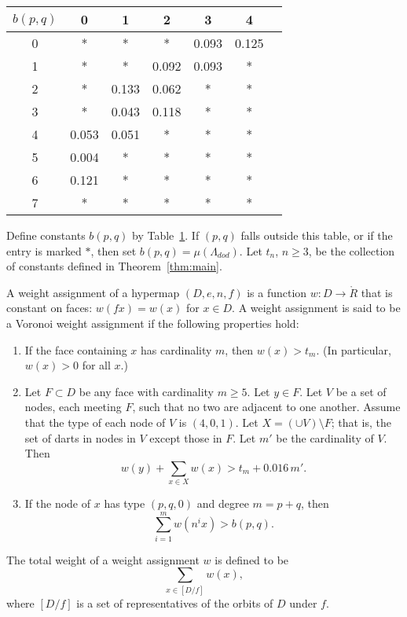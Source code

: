 \documentclass{article} %
\begin{document}
\begin{centering}
\begin{table}
\label{vertexTable}
\begin{tabular}{|c|c|c|c|c|c|c|} 
\hline
$b(p,q)$ & 0 & 1 & 2 & 3 & 4 \\
\hline
0 & * & * & * & 0.093 & 0.125  \\
1 & * & * & 0.092 & 0.093 & *  \\
2 & * & 0.133 & 0.062 & * & *  \\
3 & * & 0.043 & 0.118 & * & *  \\
4 & 0.053 & 0.051 & * & * & *  \\
5 & 0.004 & * & * & * & *  \\
6 & 0.121 & * & * & * & * \\
7 & * & * & * & * & * \\
\hline
\end{tabular}
\end{table}
\end{centering}

Define constants $b(p,q)$ by Table~\ref{vertexTable}.
If $(p,q)$ falls outside this table, or if the entry is marked $*$, then
set $b(p,q)=\mu(\Lambda_{dod})$.
Let $t_n$, $n\ge3$, be the collection of constants defined in Theorem~\ref{thm:main}.

A weight assignment of a hypermap $(D,e,n,f)$ is a function $w:D \to \ring{R}$ that
is constant on faces: $w(f x) = w(x)$ for $x\in D$.  A weight assignment is said to be a Voronoi weight assignment
if the following properties hold:
\begin{enumerate}
\item If the face containing $x$ has cardinality $m$, then $w(x)> t_m$.
(In particular, $w(x)>0$ for all $x$.)
\item Let $F\subset D$ 
be any face with cardinality $m \ge 5$.  Let $y\in F$.
Let $V$ be a set of nodes, each meeting $F$, such
that no two are adjacent to one another.  
Assume that the type of each node of $V$ is $(4,0,1)$.
Let $X =(\cup V)\setminus F$;
that is, the set of darts in nodes in $V$ except those in $F$.
Let $m'$ be the cardinality of $V$.
Then
$$
w(y) + \sum_{x\in X} w(x) > t_m  +  0.016\, m'.
$$
\item If the node of $x$ has type $(p,q,0)$ and degree $m=p+q$, then
  $$
  \sum_{i=1}^m w(n^i x) > b(p,q).
  $$
\end{enumerate}
The total weight of a weight assignment $w$ is defined to be
$$
\sum_{x\in [D/f]}  w(x),
$$
where $[D/f]$ is a set of representatives of the orbits of $D$ under $f$.
\end{document}
